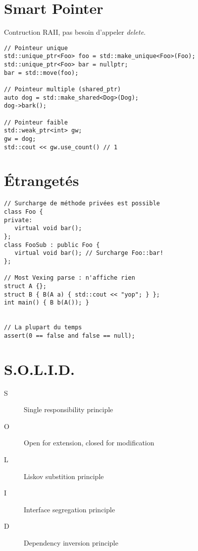 \documentclass{article}
\begin{document}
\begin{multicols*}{3}
\section*{Smart Pointer}

Contruction RAII, pas besoin d'appeler \emph{delete}.

\begin{lstlisting}
// Pointeur unique
std::unique_ptr<Foo> foo = std::make_unique<Foo>(Foo);
std::unique_ptr<Foo> bar = nullptr;
bar = std::move(foo);

// Pointeur multiple (shared_ptr)
auto dog = std::make_shared<Dog>(Dog);
dog->bark();

// Pointeur faible
std::weak_ptr<int> gw;
gw = dog;
std::cout << gw.use_count() // 1

\end{lstlisting}

\section*{Étrangetés}

\begin{lstlisting}
// Surcharge de méthode privées est possible
class Foo {
private:
   virtual void bar();
};
class FooSub : public Foo {
   virtual void bar(); // Surcharge Foo::bar!
};

// Most Vexing parse : n'affiche rien
struct A {};
struct B { B(A a) { std::cout << "yop"; } };
int main() { B b(A()); }


// La plupart du temps
assert(0 == false and false == null);
\end{lstlisting}

\section*{S.O.L.I.D.}
\begin{description}
\item[S] Single responsibility principle
\item[O] Open for extension, closed for modification
\item[L] Liskov substition principle
\item[I] Interface segregation principle
\item[D] Dependency inversion principle
\end{description}

\end{multicols*}
\end{document}

